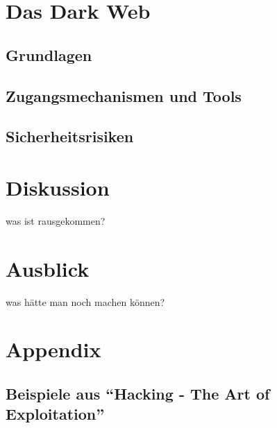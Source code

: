 \documentclass[11pt, a4paper]{article}
\begin{document}
\section{Das Dark Web}

\subsection{Grundlagen}

\subsection{Zugangsmechanismen und Tools}

\subsection{Sicherheitsrisiken}

\section{Diskussion}
was ist rausgekommen?

\section{Ausblick}
was hätte man noch machen können?


\appendix
\newpage
\renewcommand{\thesubsection}{\Alph{subsection}}
\pagebreak

\section{Appendix}
\subsection{Beispiele aus ``Hacking - The Art of Exploitation''~\cite{erickson2008hacking}}\label{subsec:beispiele}



\newpage
\printbibliography
\listoffigures
\listoftables
\printglossaries
\end{document}
